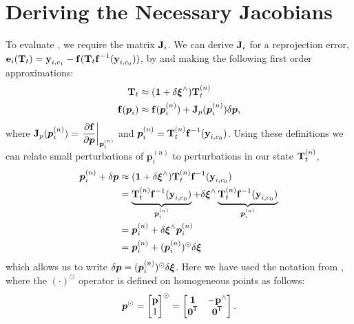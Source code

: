 \section{Deriving the Necessary Jacobians}
To evaluate , we require the matrix $\boldsymbol{\mathbf{J}}_{i}$. We can derive $\boldsymbol{\mathbf{J}}_{i}$ for a reprojection error, $\boldsymbol{\mathbf{e}}_{i}(\boldsymbol{\mathbf{T}}_t)  = \boldsymbol{\mathbf{y}}_{i, c_1} - \boldsymbol{\mathbf{f}}( \boldsymbol{\mathbf{T}}_t 
    \boldsymbol{\mathbf{f}}^{-1}( \boldsymbol{\mathbf{y}}_{i, c_0} ) )$, by and making the following first order approximations:
    \begin{align}
    	\boldsymbol{\mathbf{T}}_t &\approx (\boldsymbol{\mathbf{1}} + \delta\boldsymbol{\mathbf{\xi}}^{\wedge}) \boldsymbol{\mathbf{T}}_t^{(n)} \\
    	\boldsymbol{\mathbf{f}}(\boldsymbol{p}_i) & \approx \boldsymbol{\mathbf{f}}(\boldsymbol{p}_i^{(n)}) + \boldsymbol{\mathbf{J}}_p (\boldsymbol{p}_i^{(n)})  \delta \boldsymbol{p},
    \end{align}
where $\boldsymbol{\mathbf{J}}_p(\boldsymbol{p}_i^{(n)}) = \left.\dfrac{\partial \boldsymbol{\mathbf{f}}}{\partial \boldsymbol{p}}\right|_{\boldsymbol{p}_i^{(n)}}$ and $\boldsymbol{p}_i^{(n)} = \boldsymbol{\mathbf{T}}_t^{(n)} 
    \boldsymbol{\mathbf{f}}^{-1}(\boldsymbol{\mathbf{y}}_{i, c_0})$. Using these definitions we can relate small perturbations of $\boldsymbol{p}_i^{(n)}$ to perturbations in our state $\boldsymbol{\mathbf{T}}_t^{(n)}$,
\begin{align}
	\boldsymbol{p}_i^{(n)} + \delta \boldsymbol{p} &\approx (\boldsymbol{\mathbf{1}} + \delta\boldsymbol{\mathbf{\xi}}^{\wedge}) \boldsymbol{\mathbf{T}}_t^{(n)} 
    \boldsymbol{\mathbf{f}}^{-1}( \boldsymbol{\mathbf{y}}_{i, c_0} ) \\
    &= \underbrace{\boldsymbol{\mathbf{T}}_t^{(n)} 
    \boldsymbol{\mathbf{f}}^{-1}(\boldsymbol{\mathbf{y}}_{i, c_0})}_{\boldsymbol{p}_i^{(n)}} + \delta\boldsymbol{\mathbf{\xi}}^{\wedge}\underbrace{\boldsymbol{\mathbf{T}}_t^{(n)} 
    \boldsymbol{\mathbf{f}}^{-1}(\boldsymbol{\mathbf{y}}_{i, c_0})}_{\boldsymbol{p}_i^{(n)}} \\
    &= \boldsymbol{p}_i^{(n)} + \delta\boldsymbol{\mathbf{\xi}}^{\wedge} \boldsymbol{p}_i^{(n)} \\
    &= \boldsymbol{p}_i^{(n)} + (\boldsymbol{p}_i^{(n)})^\odot \delta\boldsymbol{\mathbf{\xi}}
\end{align}
which allows us to write $\delta \boldsymbol{p} = (\boldsymbol{p}_i^{(n)})^\odot \delta\boldsymbol{\mathbf{\xi}}$. Here we have used the notation from \cite{Barfoot2017-ri}, where the $(\cdot)^\odot$ operator is defined on homogeneous points as follows:
\begin{equation}
\boldsymbol{p}^\odot = \begin{bmatrix} \boldsymbol{\mathbf{p}} \\ 1 \end{bmatrix}^\odot = \begin{bmatrix} \boldsymbol{\mathbf{1}} & -\boldsymbol{\mathbf{p}}^\wedge \\ \boldsymbol{\mathbf{0}}^{\mkern-1.0mu\mathsf{T}} & \boldsymbol{\mathbf{0}}^{\mkern-1.0mu\mathsf{T}}\end{bmatrix}.
\end{equation}
